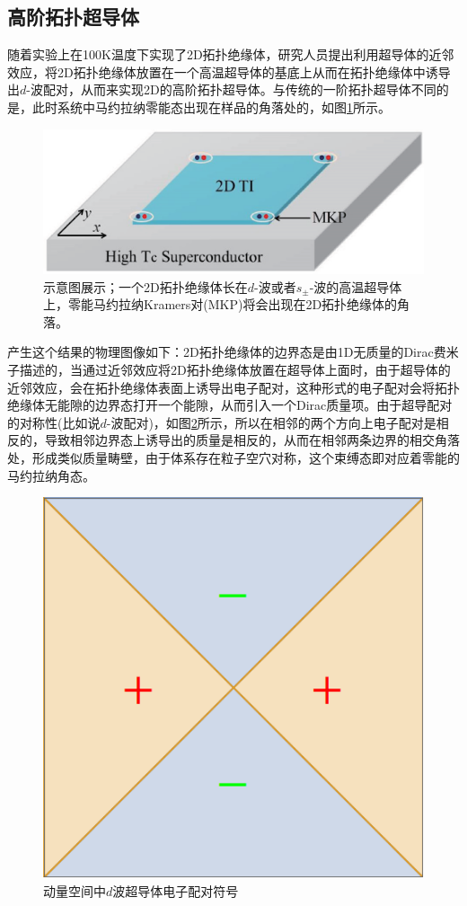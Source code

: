 \subsection{高阶拓扑超导体}
 随着实验上在100K温度下实现了2D拓扑绝缘体\cite{re41,re42}，研究人员提出利用超导体的近邻效应，将2D拓扑绝缘体放置在一个高温超导体的基底上从而在拓扑绝缘体中诱导出$d$-波配对，从而来实现2D的高阶拓扑超导体\cite{re28,re27}。与传统的一阶拓扑超导体不同的是，此时系统中马约拉纳零能态出现在样品的角落处的，如图\ref{fig8}所示。
\begin{figure}[h]
\centering
\includegraphics[scale=0.7]{pic/fig8}
\caption{示意图展示；一个2D拓扑绝缘体长在$d$-波或者$s_\pm$-波的高温超导体上，零能马约拉纳Kramers对(MKP)将会出现在2D拓扑绝缘体的角落\cite{re28}。}\label{fig8}
\end{figure}
产生这个结果的物理图像如下：2D拓扑绝缘体的边界态是由1D无质量的Dirac费米子描述的，当通过近邻效应将2D拓扑绝缘体放置在超导体上面时，由于超导体的近邻效应，会在拓扑绝缘体表面上诱导出电子配对，这种形式的电子配对会将拓扑绝缘体无能隙的边界态打开一个能隙，从而引入一个Dirac质量项。由于超导配对的对称性(比如说$d$-波配对)，如图\ref{fig22}所示，所以在相邻的两个方向上电子配对是相反的，导致相邻边界态上诱导出的质量是相反的，从而在相邻两条边界的相交角落处，形成类似质量畴壁，由于体系存在粒子空穴对称，这个束缚态即对应着零能的马约拉纳角态。
\begin{figure}[h]
	\centering
	\includegraphics[scale=0.5]{pic/dwave}
	\caption{动量空间中$d$波超导体电子配对符号}\label{fig22}
\end{figure}
